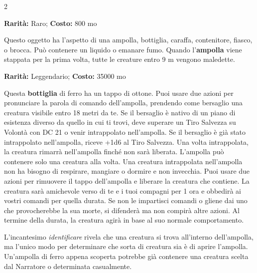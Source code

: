 \begin{multicols}{2}

\textbf{Rarità:} Raro; \textbf{Costo:} 800 mo

Questo oggetto ha l'aspetto di una ampolla, bottiglia, caraffa, contenitore, fiasco, o brocca. Può contenere un liquido o emanare fumo. Quando l'\textbf{ampolla} viene stappata per la prima volta, tutte le creature entro 9 m vengono maledette.


\textbf{Rarità:} Leggendario; \textbf{Costo:} 35000 mo

Questa \textbf{bottiglia} di ferro ha un tappo di ottone. Puoi usare due azioni per pronunciare la parola di comando dell'ampolla, prendendo come bersaglio una creatura visibile entro 18 metri da te. Se il bersaglio è nativo di un piano di esistenza diverso da quello in cui ti trovi, deve superare un Tiro Salvezza su Volontà con DC 21 o venir intrappolato nell'ampolla. Se il bersaglio è già stato intrappolato nell'ampolla, riceve +1d6 al Tiro Salvezza. Una volta intrappolata, la creatura rimarrà nell'ampolla finché non sarà liberata. L'ampolla può contenere solo una creatura alla volta. Una creatura intrappolata nell'ampolla non ha bisogno di respirare, mangiare o dormire e non invecchia. Puoi usare due azioni per rimuovere il tappo dell'ampolla e liberare la creatura che contiene. La creatura sarà amichevole verso di te e i tuoi compagni per 1 ora e obbedirà ai vostri comandi per quella durata. Se non le impartisci comandi o gliene dai uno che provocherebbe la sua morte, si difenderà ma non compirà altre azioni. Al termine della durata, la creatura agirà in base al suo normale comportamento.

L'incantesimo \emph{identificare} rivela che una creatura si trova all'interno dell'ampolla, ma l'unico modo per determinare che sorta di creatura sia è di aprire l'ampolla. Un'ampolla di ferro appena scoperta potrebbe già contenere una creatura scelta dal Narratore o determinata casualmente.

\medskip


\end{multicols}
